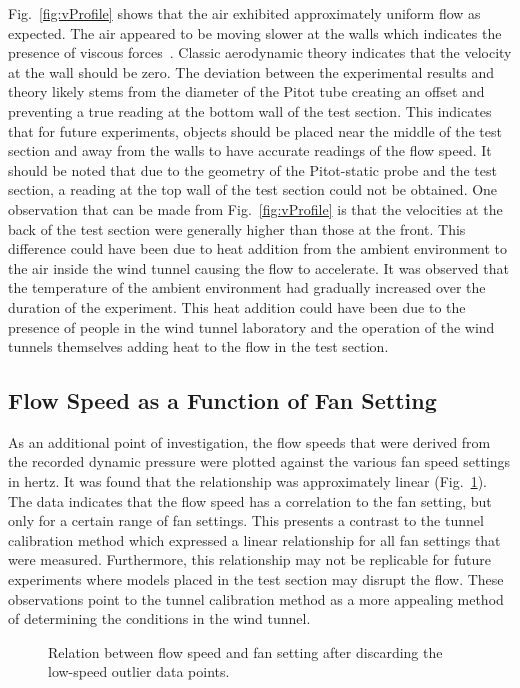 \documentclass[journal,letterpaper]{IEEEtran}
\begin{document}
Fig.~\ref{fig:vProfile} shows that the air exhibited approximately uniform flow as expected.
The air appeared to be moving slower at the walls which indicates the presence of viscous forces~\cite{lecture}.
Classic aerodynamic theory indicates that the velocity at the wall should be zero.
The deviation between the experimental results and theory likely stems from the diameter of the Pitot tube creating an offset and preventing a true reading at the bottom wall of the test section.
This indicates that for future experiments, objects should be placed near the middle of the test section and away from the walls to have accurate readings of the flow speed.
It should be noted that due to the geometry of the Pitot-static probe and the test section, a reading at the top wall of the test section could not be obtained.
One observation that can be made from Fig.~\ref{fig:vProfile} is that the velocities at the back of the test section were generally higher than those at the front.
This difference could have been due to heat addition from the ambient environment to the air inside the wind tunnel causing the flow to accelerate.
It was observed that the temperature of the ambient environment had gradually increased over the duration of the experiment.
This heat addition could have been due to the presence of people in the wind tunnel laboratory and the operation of the wind tunnels themselves adding heat to the flow in the test section.

\subsection{Flow Speed as a Function of Fan Setting}

As an additional point of investigation, the flow speeds that were derived from the recorded dynamic pressure were plotted against the various fan speed settings in hertz.
It was found that the relationship was approximately linear (Fig.~\ref{fig:Hz}).
The data indicates that the flow speed has a correlation to the fan setting, but only for a certain range of fan settings.
This presents a contrast to the tunnel calibration method which expressed a linear relationship for all fan settings that were measured.
Furthermore, this relationship may not be replicable for future experiments where models placed in the test section may disrupt the flow.
These observations point to the tunnel calibration method as a more appealing method of determining the conditions in the wind tunnel.

\begin{figure}[H]
    \centering
    
    \caption{Relation between flow speed and fan setting after discarding the low-speed outlier data points.}
    \label{fig:Hz}
\end{figure}
\end{document}
